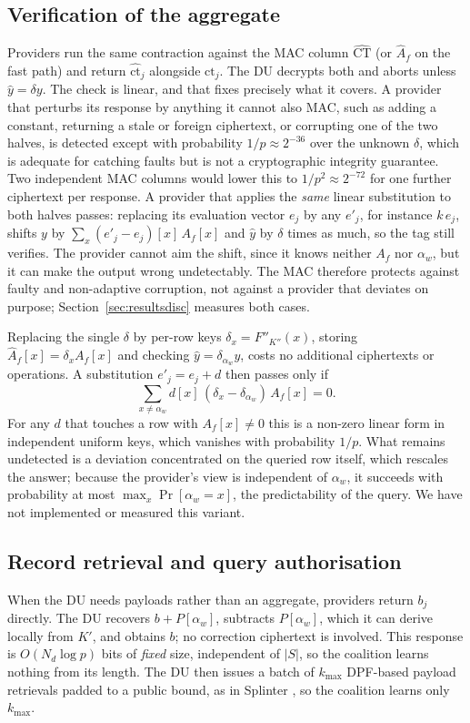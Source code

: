 \documentclass[a4paper,fleqn]{cas-dc}
\begin{document}
\subsection{Verification of the aggregate}
\label{sec:verify}
Providers run the same contraction against the MAC column
$\widehat{\text{CT}}$ (or $\widehat{A}_f$ on the fast path) and return
$\widehat{\text{ct}}_j$ alongside $\text{ct}_j$. The DU decrypts both and
aborts unless $\hat{y}=\delta y$. The check is linear, and that fixes
precisely what it covers. A provider that perturbs its response by anything it
cannot also MAC, such as adding a constant, returning a stale or foreign
ciphertext, or corrupting one of the two halves, is detected except with
probability $1/p\approx2^{-36}$ over the unknown $\delta$, which is adequate
for catching faults but is not a cryptographic integrity guarantee. Two
independent MAC columns would lower this to $1/p^2\approx2^{-72}$ for one
further ciphertext per response. A provider that applies the \emph{same}
linear substitution to both halves passes: replacing its evaluation vector
$e_j$ by any $e'_j$, for instance $k\,e_j$, shifts $y$ by
$\sum_x(e'_j-e_j)[x]\,A_f[x]$ and $\hat y$ by $\delta$ times as much, so the
tag still verifies. The provider cannot aim the shift, since it knows neither
$A_f$ nor $\alpha_w$, but it can make the output wrong undetectably. The MAC
therefore protects against faulty and non-adaptive corruption, not against a
provider that deviates on purpose; Section~\ref{sec:resultsdisc} measures both
cases.

\begin{remark}
\label{rem:rowmac}
Replacing the single $\delta$ by per-row keys $\delta_x=F''_{K''}(x)$, storing
$\widehat{A}_f[x]=\delta_x A_f[x]$ and checking $\hat y=\delta_{\alpha_w}y$,
costs no additional ciphertexts or operations. A substitution $e'_j=e_j+d$
then passes only if
\[
\textstyle\sum_{x\neq\alpha_w}d[x]\,(\delta_x-\delta_{\alpha_w})\,A_f[x]=0 .
\]
For any $d$ that touches a row with $A_f[x]\neq 0$ this is a
non-zero linear form in independent uniform keys, which vanishes with
probability $1/p$. What remains undetected is a deviation concentrated on the
queried row itself, which rescales the answer; because the provider's view is
independent of $\alpha_w$, it succeeds with probability at most
$\max_x\Pr[\alpha_w=x]$, the predictability of the query. We have not
implemented or measured this variant.
\end{remark}

\subsection{Record retrieval and query authorisation}
\label{sec:auth}
When the DU needs payloads rather than an aggregate, providers return $b_j$
directly. The DU recovers $b+P[\alpha_w]$, subtracts $P[\alpha_w]$, which it
can derive locally from $K'$, and obtains $b$; no correction ciphertext is
involved. This response is $O(N_d\log p)$ bits of \emph{fixed} size,
independent of $|S|$, so the coalition learns nothing from its length. The DU
then issues a batch of $k_{\max}$ DPF-based payload retrievals padded to a
public bound, as in Splinter \citep{splinter}, so the coalition learns only
$k_{\max}$.
\end{document}
